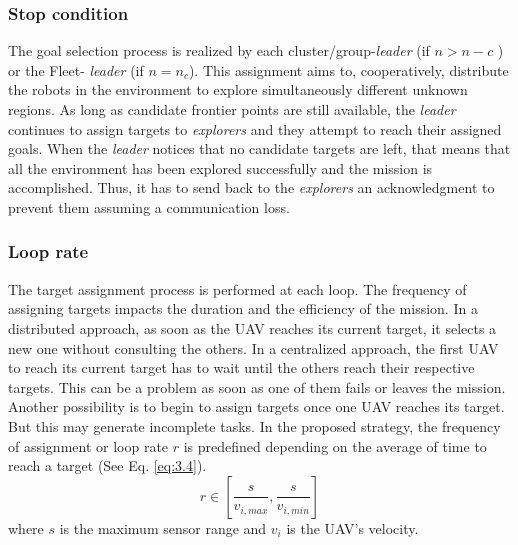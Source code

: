 \documentclass[11pt,openany]{book}
\begin{document}
\subsubsection{Stop condition}
The goal selection process is realized by each cluster/group-\textit{leader} (if $n>n-c$ ) or the Fleet- \textit{leader} (if $n=n_c$). This assignment aims to, cooperatively, distribute the robots in the environment to explore simultaneously diﬀerent unknown regions. As long as candidate frontier points are still available, the \textit{leader} continues to assign targets to \textit{explorers} and they attempt to reach their assigned goals. When the \textit{leader} notices that no candidate targets are left, that means that all the environment has been explored successfully and the mission is accomplished. Thus, it has to send back to the \textit{explorers} an acknowledgment to prevent them assuming a communication loss.
\subsubsection{Loop rate}
The target assignment process is performed at each loop. The frequency of assigning targets impacts the duration and the eﬃciency of the mission. In a distributed approach, as soon as the UAV reaches its current target, it selects a new one without consulting the others. In a centralized approach, the ﬁrst UAV to reach its current target has to wait until the others reach their respective targets. This can be a problem as soon as one of them fails or leaves the mission. Another possibility is to begin to assign targets once one UAV reaches its target. But this may generate incomplete tasks. In the proposed strategy, the frequency of assignment or loop rate $r$ is predeﬁned depending on the average of time to reach a target (See Eq. \ref{eq:3.4}).
\begin{equation} \label{eq:3.4}
    r \in [\frac{s}{v_{i,max}},\frac{s}{v_{i,min}}]
\end{equation}
where $s$ is the maximum sensor range and $v_i$ is the UAV's velocity.
\end{document}
